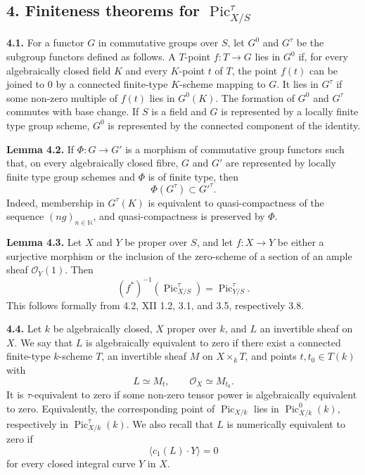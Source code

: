 \documentclass[11pt]{article}
\providecommand{\Pic}{\operatorname{Pic}}
\begin{document}
\subsection*{4. Finiteness theorems for $\Pic^\tau_{X/S}$}
\textbf{4.1.} For a functor $G$ in commutative groups over $S$, let $G^0$ and $G^\tau$ be the subgroup functors defined as follows. A $T$-point $f:T\to G$ lies in $G^0$ if, for every algebraically closed field $K$ and every $K$-point $t$ of $T$, the point $f(t)$ can be joined to $0$ by a connected finite-type $K$-scheme mapping to $G$. It lies in $G^\tau$ if some non-zero multiple of $f(t)$ lies in $G^0(K)$. The formation of $G^0$ and $G^\tau$ commutes with base change. If $S$ is a field and $G$ is represented by a locally finite type group scheme, $G^0$ is represented by the connected component of the identity.

\textbf{Lemma 4.2.} If $\Phi:G\to G'$ is a morphism of commutative group functors such that, on every algebraically closed fibre, $G$ and $G'$ are represented by locally finite type group schemes and $\Phi$ is of finite type, then
\[
 \Phi(G^\tau)\subset G'^\tau.
\]
Indeed, membership in $G^\tau(K)$ is equivalent to quasi-compactness of the sequence $(ng)_{n\in\mathbb N}$, and quasi-compactness is preserved by $\Phi$.

\textbf{Lemma 4.3.} Let $X$ and $Y$ be proper over $S$, and let $f:X\to Y$ be either a surjective morphism or the inclusion of the zero-scheme of a section of an ample sheaf $\mathcal O_Y(1)$. Then
\[
 (f^*)^{-1}(\Pic^\tau_{X/S})=\Pic^\tau_{Y/S}.
\]
This follows formally from 4.2, XII 1.2, 3.1, and 3.5, respectively 3.8.

\textbf{4.4.} Let $k$ be algebraically closed, $X$ proper over $k$, and $L$ an invertible sheaf on $X$. We say that $L$ is algebraically equivalent to zero if there exist a connected finite-type $k$-scheme $T$, an invertible sheaf $M$ on $X\times_kT$, and points $t,t_0\in T(k)$ with
\[
 L\simeq M_t,
\qquad
 \mathcal O_X\simeq M_{t_0}.
\]
It is $\tau$-equivalent to zero if some non-zero tensor power is algebraically equivalent to zero. Equivalently, the corresponding point of $\Pic_{X/k}$ lies in $\Pic^0_{X/k}(k)$, respectively in $\Pic^\tau_{X/k}(k)$. We also recall that $L$ is numerically equivalent to zero if
\[
 \langle c_1(L)\cdot Y\rangle=0
\]
for every closed integral curve $Y$ in $X$.
\end{document}
